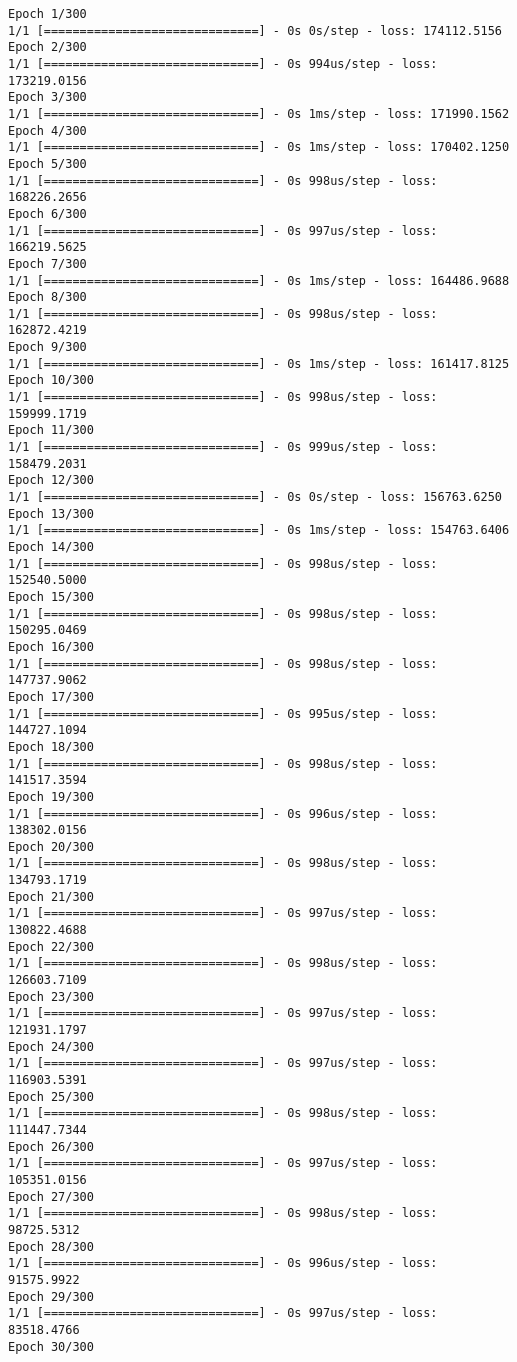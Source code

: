 \documentclass[11pt]{article}
\begin{document}
    \begin{Verbatim}[commandchars=\\\{\}]
Epoch 1/300
1/1 [==============================] - 0s 0s/step - loss: 174112.5156
Epoch 2/300
1/1 [==============================] - 0s 994us/step - loss: 173219.0156
Epoch 3/300
1/1 [==============================] - 0s 1ms/step - loss: 171990.1562
Epoch 4/300
1/1 [==============================] - 0s 1ms/step - loss: 170402.1250
Epoch 5/300
1/1 [==============================] - 0s 998us/step - loss: 168226.2656
Epoch 6/300
1/1 [==============================] - 0s 997us/step - loss: 166219.5625
Epoch 7/300
1/1 [==============================] - 0s 1ms/step - loss: 164486.9688
Epoch 8/300
1/1 [==============================] - 0s 998us/step - loss: 162872.4219
Epoch 9/300
1/1 [==============================] - 0s 1ms/step - loss: 161417.8125
Epoch 10/300
1/1 [==============================] - 0s 998us/step - loss: 159999.1719
Epoch 11/300
1/1 [==============================] - 0s 999us/step - loss: 158479.2031
Epoch 12/300
1/1 [==============================] - 0s 0s/step - loss: 156763.6250
Epoch 13/300
1/1 [==============================] - 0s 1ms/step - loss: 154763.6406
Epoch 14/300
1/1 [==============================] - 0s 998us/step - loss: 152540.5000
Epoch 15/300
1/1 [==============================] - 0s 998us/step - loss: 150295.0469
Epoch 16/300
1/1 [==============================] - 0s 998us/step - loss: 147737.9062
Epoch 17/300
1/1 [==============================] - 0s 995us/step - loss: 144727.1094
Epoch 18/300
1/1 [==============================] - 0s 998us/step - loss: 141517.3594
Epoch 19/300
1/1 [==============================] - 0s 996us/step - loss: 138302.0156
Epoch 20/300
1/1 [==============================] - 0s 998us/step - loss: 134793.1719
Epoch 21/300
1/1 [==============================] - 0s 997us/step - loss: 130822.4688
Epoch 22/300
1/1 [==============================] - 0s 998us/step - loss: 126603.7109
Epoch 23/300
1/1 [==============================] - 0s 997us/step - loss: 121931.1797
Epoch 24/300
1/1 [==============================] - 0s 997us/step - loss: 116903.5391
Epoch 25/300
1/1 [==============================] - 0s 998us/step - loss: 111447.7344
Epoch 26/300
1/1 [==============================] - 0s 997us/step - loss: 105351.0156
Epoch 27/300
1/1 [==============================] - 0s 998us/step - loss: 98725.5312
Epoch 28/300
1/1 [==============================] - 0s 996us/step - loss: 91575.9922
Epoch 29/300
1/1 [==============================] - 0s 997us/step - loss: 83518.4766
Epoch 30/300

\end{Verbatim}
\end{document}

